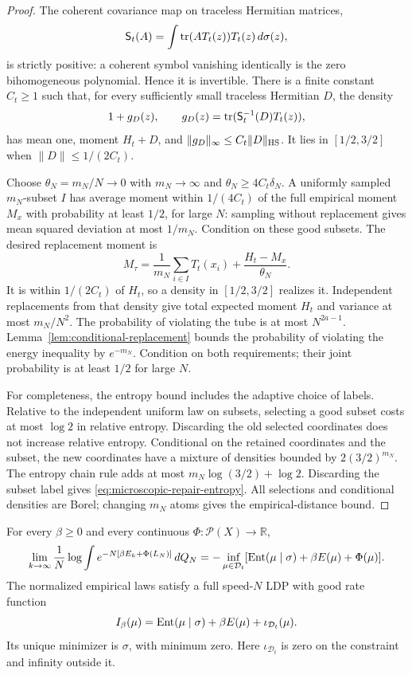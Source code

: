 \begin{proof}
The coherent covariance map on traceless Hermitian matrices,
\[
 \mathsf S_t(A)=\int\operatorname{tr}(AT_t(z))T_t(z)\,d\sigma(z),
\]
is strictly positive: a coherent symbol vanishing identically is the
zero bihomogeneous polynomial.  Hence it is invertible.  There is a
finite constant $C_t\geq1$ such that, for every sufficiently small
traceless Hermitian $D$, the density
\[
 1+g_D(z),\qquad
 g_D(z)=\operatorname{tr}(\mathsf S_t^{-1}(D)T_t(z)),
\]
has mean one, moment $H_t+D$, and
$\|g_D\|_\infty\leq C_t\|D\|_{\operatorname{HS}}$.  It lies in $[1/2,3/2]$
when $\|D\|\leq1/(2C_t)$.

Choose $\theta_N=m_N/N\to0$ with $m_N\to\infty$ and
$\theta_N\geq4C_t\delta_N$.  A uniformly sampled $m_N$-subset
$I$ has average moment within $1/(4C_t)$ of the full empirical
moment $M_x$ with probability at least $1/2$, for large $N$:
sampling without replacement gives mean squared deviation at most
$1/m_N$.  Condition on these good subsets.  The desired replacement
moment is
\[
 M_\tau=\frac1{m_N}\sum_{i\in I}T_t(x_i)
                      +\frac{H_t-M_x}{\theta_N}.
\]
It is within $1/(2C_t)$ of $H_t$, so a density in $[1/2,3/2]$
realizes it.  Independent replacements from that density give total
expected moment $H_t$ and variance at most $m_N/N^2$.
The probability of violating the tube is at most $N^{2a-1}$.
Lemma~\ref{lem:conditional-replacement} bounds the probability of
violating the energy inequality by $e^{-m_N}$.  Condition on both
requirements; their joint probability is at least $1/2$ for large $N$.

For completeness, the entropy bound includes the adaptive choice of
labels.  Relative to the independent uniform law on subsets, selecting
a good subset costs at most $\log2$ in relative entropy.  Discarding
the old selected coordinates does not increase relative entropy.
Conditional on the retained coordinates and the subset, the new
coordinates have a mixture of densities bounded by
$2(3/2)^{m_N}$.  The entropy chain rule adds at most
$m_N\log(3/2)+\log2$.  Discarding the subset label gives
\eqref{eq:microscopic-repair-entropy}.  All selections and conditional
densities are Borel; changing $m_N$ atoms gives the empirical-distance
bound.
\end{proof}

\begin{theorem}
\label{thm:repulsive-design-ldp}
For every $\beta\geq0$ and every continuous
$\Phi:\mathcal P(X)\to\mathbb R$,
\begin{equation}
 \lim_{k\to\infty}\frac1N\log
       \int e^{-N[\beta E_k+\Phi(L_N)]}\,dQ_N
 =-\inf_{\mu\in\mathcal D_t}
       [\operatorname{Ent}(\mu\mid\sigma)+\beta E(\mu)+\Phi(\mu)].
 \label{eq:repulsive-design-laplace}
\end{equation}
The normalized empirical laws satisfy a full speed-$N$ LDP with good
rate function
\[
 I_\beta(\mu)=\operatorname{Ent}(\mu\mid\sigma)+\beta E(\mu)
                         +\iota_{\mathcal D_t}(\mu).
\]
Its unique minimizer is $\sigma$, with minimum zero.  Here
$\iota_{\mathcal D_t}$ is zero on the constraint and infinity outside it.
\end{theorem}

